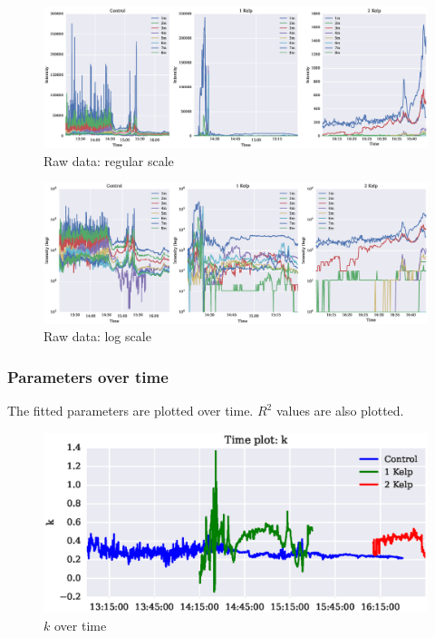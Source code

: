 \documentclass{article}
\newcommand\plotwidth{7in}
\begin{document}
\begin{figure}[H]
	\centering
	\includegraphics[width=\textwidth]{light_data.eps}
	\caption{Raw data: regular scale}
\end{figure}

\begin{figure}[H]
	\centering
	\includegraphics[width=\textwidth]{light_data_log.eps}
	\caption{Raw data: log scale}
\end{figure}

\pagebreak
\subsubsection{Parameters over time}
The fitted parameters are plotted over time. $R^2$ values are also plotted.

\begin{figure}[H]
	\centering
	\includegraphics[width=\plotwidth]{time_k.eps}
	\caption{$k$ over time}
	\label{time_k}
\end{figure}
\end{document}
